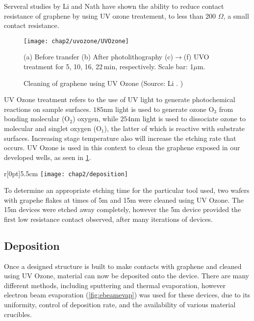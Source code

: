 \documentclass[../../Matt_Gebert_Honours_Thesis.tex]{subfiles}
\begin{document}
	Serveral studies by Li \etal\cite{li_ultraviolet/ozone_2013} and Nath \etal\cite{nath_achieving_2014,nath_search_2016} have shown the ability to reduce contact resistance of graphene by using UV ozone treatement, to less than 200 $\Omega$, a small contact resistance.
	
	\begin{figure}[H]
		\centering
		\texttt{[image: chap2/uvozone/UVOzone]}
		\caption[Cleaning of graphene using UV Ozone]{Cleaning of graphene using UV Ozone (Source: Li \etal. \cite{li_ultraviolet/ozone_2013})}\label{fig:UV_ozone} (a) Before transfer (b) After photolithography  (c)$\to$(f) UVO treatment for 5, 10, 16, 22 min, respectively. Scale bar: 1$\mu$m.
	\end{figure}
	
	UV Ozone treatment refers to the use of UV light to generate photochemical reactions on sample surfaces. $185$nm light is used to generate ozone O$_3$ from bonding molecular (O$_2$) oxygen, while $254$nm light is used to dissociate ozone to molecular and singlet oxygen (O$_1$), the latter of which is reactive with substrate surfaces. Increasing stage temperature also will increase the etching rate that occurs. UV Ozone is used in this context to clean the graphene exposed in our developed wells, as seen in \cref{fig:UV_ozone}.
	
	\begin{wrapfigure}[13]{r}[0pt]{5.5cm}
		\vspace{-0.5cm}
		\centering
		\texttt{[image: chap2/deposition]}
		\caption[E-beam Evaporation]{E-beam Evaporation (Source: \cite{noauthor_understanding_nodate})}\label{fig:ebeamevap}
	\end{wrapfigure}
	
	To determine an appropriate etching time for the particular tool used, two wafers with grapehe flakes at times of 5m and 15m were cleaned using UV Ozone. The 15m devices were etched away completely, however the 5m device provided the first low resistance contact observed, after many iterations of devices.
	
	
	\subsection{Deposition}\label{sec:deposition}

	Once a designed structure is built to make contacts with graphene and cleaned using UV Ozone, material can now be deposited onto the device. There are many different methods, including sputtering and thermal evaporation, however electron beam evaporation (\cref{fig:ebeamevap}) was used for these devices, due to its uniformity, control of deposition rate, and the availability of various material crucibles.
	
\end{document}
